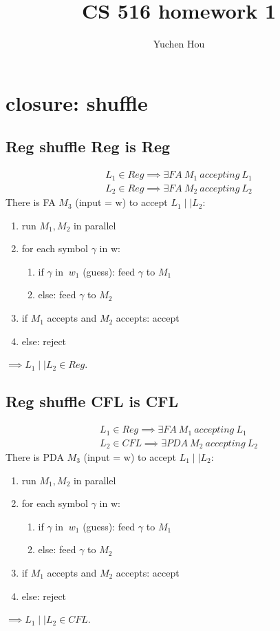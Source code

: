 \documentclass{article}
\begin{document}
\lstset{language=python}
\title{CS 516 homework 1}
\author{Yuchen Hou}
\maketitle

\section{closure: shuffle}

\subsection{Reg shuffle Reg is Reg}

\begin{align*}
	L_1 \in Reg \implies \exists FA \ M_1 \ accepting \ L_1\\
	L_2 \in Reg \implies \exists FA \ M_2 \ accepting \ L_2
\end{align*}
There is FA $ M_3 $ (input = w) to accept $ L_1 \mid \mid  L_2 $:
\begin{enumerate}
	\item run $ M_1, M_2 $ in parallel
	\item for each symbol $\gamma $ in w:
	\begin{enumerate}
		\item if $ \gamma $ in $ \ w_1 $ (guess): feed $ \gamma $ to $ M_1 $
		\item else: feed $ \gamma $ to $ M_2 $
	\end{enumerate}
	\item if $ M_1 $ accepts and $ M_2 $ accepts: accept
	\item else: reject	
\end{enumerate}
$ \implies L_1 \mid \mid  L_2 \in Reg$.

\subsection{Reg shuffle CFL is CFL}

\begin{align*}
L_1 \in Reg \implies \exists FA \ M_1 \ accepting \ L_1\\
L_2 \in CFL \implies \exists PDA \ M_2 \ accepting \ L_2
\end{align*}
There is PDA $ M_3 $ (input = w) to accept $ L_1 \mid \mid  L_2 $:
\begin{enumerate}
	\item run $ M_1, M_2 $ in parallel
	\item for each symbol $\gamma $ in w:
	\begin{enumerate}
		\item if $ \gamma $ in $ \ w_1 $ (guess): feed $ \gamma $ to $ M_1 $
		\item else: feed $ \gamma $ to $ M_2 $
	\end{enumerate}
	\item if $ M_1 $ accepts and $ M_2 $ accepts: accept
	\item else: reject	
\end{enumerate}
$\implies L_1 \mid \mid  L_2 \in CFL$.
\end{document}
